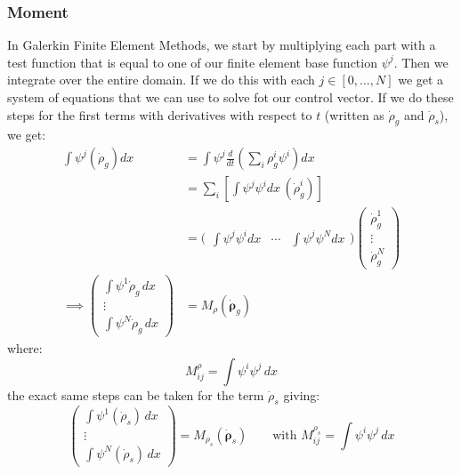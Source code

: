 \subsubsection*{Moment}
In Galerkin Finite Element Methods, we start by multiplying each part with a test function that is equal to one of our finite element base function $\psi^j$. Then we integrate over the entire domain. If we do this with each $j\in[0,\ldots,N]$ we get a system of equations that we can use to solve fot our control vector. If we do these steps for the first terms with derivatives with respect to $t$ (written as $\dot{\rho}_g$ and $\dot{\rho}_s$), we get:
\begin{equation*}
    \begin{aligned}
        \int \psi^j (\dot{\rho}_g) dx &= \int \psi^j \frac{d}{dt}\left(\sum_i \rho_g^i\psi^i\right) dx \\
        &= \sum_i \left[ \int \psi^j \psi^i dx \,(\dot{\rho}_g^i) \right]\\
        &= \bigg(\begin{matrix}
            \int \psi^j \psi^i dx & \cdots & \int \psi^j \psi^N dx
        \end{matrix}\bigg)
        \begin{pmatrix}
            \dot{\rho}_g^1 \\ 
            \vdots \\ 
            \dot{\rho}_g^N
        \end{pmatrix}\\
        \implies \begin{pmatrix}
            \int \psi^1 \dot{\rho}_g \,dx \\
            \vdots \\
            \int \psi^N \dot{\rho}_g \,dx
        \end{pmatrix}
        &= M_{\rho}(\dot{\boldsymbol{\rho}}_g)
    \end{aligned}
\end{equation*}
where:
\begin{equation*}
    M^\rho_{ij}=\int\psi^i\psi^j\,dx
\end{equation*}
the exact same steps can be taken for the term $\dot{\rho}_s$ giving:
\begin{equation*}
            \begin{pmatrix}
            \int \psi^1 (\dot{\rho}_s) \,dx \\
            \vdots \\
            \int \psi^N (\dot{\rho}_s) \,dx
        \end{pmatrix}
        = M_{\rho_s}(\dot{\boldsymbol{\rho}}_s) \qquad \text{with } M^{\rho_s}_{ij}=\int\psi^i\psi^j\,dx
\end{equation*}
